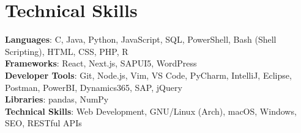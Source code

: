 \documentclass[letterpaper,11pt]{article}
\begin{document}
\section{Technical Skills}
 \begin{itemize}[leftmargin=0.15in, label={}]
    \small{\item{
     \textbf{Languages}{: C, Java, Python, JavaScript, SQL, PowerShell, Bash (Shell Scripting), HTML, CSS, PHP, R} \\
     \textbf{Frameworks}{: React, Next.js, SAPUI5, WordPress} \\
     \textbf{Developer Tools}{: Git, Node.js, Vim, VS Code, PyCharm, IntelliJ, Eclipse, Postman, PowerBI, Dynamics365, SAP, jQuery} \\
     \textbf{Libraries}{: pandas, NumPy} \\
     \textbf{Technical Skills}{: Web Development, GNU/Linux (Arch), macOS, Windows, SEO, RESTful APIs}
    }}
 \end{itemize}


\end{document}
